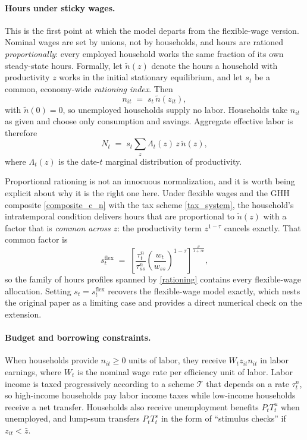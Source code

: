 \paragraph{Hours under sticky wages.} This is the first point at which the
model departs from the flexible-wage version. Nominal wages are set by unions,
not by households, and hours are rationed \emph{proportionally}: every employed
household works the same fraction of its own steady-state hours. Formally, let
$\tilde n(z)$ denote the hours a household with productivity $z$ works in the
initial stationary equilibrium, and let $s_t$ be a common, economy-wide
\emph{rationing index}. Then
\begin{equation}\label{rationing}
  n_{it} \;=\; s_t\,\tilde n(z_{it}),
\end{equation}
with $\tilde n(0)=0$, so unemployed households supply no labor. Households take
$n_{it}$ as given and choose only consumption and savings. Aggregate effective
labor is therefore
\begin{equation}\label{agg_labor_rationed}
  N_t \;=\; s_t \sum_{z} \Lambda_t(z)\, z\, \tilde n(z),
\end{equation}
where $\Lambda_t(z)$ is the date-$t$ marginal distribution of productivity.

Proportional rationing is not an innocuous normalization, and it is worth being
explicit about why it is the right one here. Under flexible wages and the GHH
composite \eqref{composite_c_n} with the tax scheme \eqref{tax_system}, the
household's intratemporal condition delivers hours that are proportional to
$\tilde n(z)$ with a factor that is \emph{common across $z$}: the productivity
term $z^{1-\tau}$ cancels exactly. That common factor is
\begin{equation}\label{s_flex}
  s^{\text{flex}}_t \;=\;
  \left[\frac{\tau_t^n}{\tau^n_{ss}}\left(\frac{w_t}{w_{ss}}\right)^{1-\tau}\right]^{\frac{\nu}{1+\tau\nu}} ,
\end{equation}
so the family of hours profiles spanned by \eqref{rationing} contains every
flexible-wage allocation. Setting $s_t = s^{\text{flex}}_t$ recovers the
flexible-wage model exactly, which nests the original paper as a limiting case
and provides a direct numerical check on the extension.

\paragraph{Budget and borrowing constraints.} When households provide
$n_{it}\geq0$ units of labor, they receive $W_tz_{it}n_{it}$ in labor earnings,
where $W_t$ is the nominal wage rate per efficiency unit of labor. Labor income
is taxed progressively according to a
\textcite{Heathcote-Storesletten-Violante-2017} scheme $\mathcal{T}$ that
depends on a rate $\tau^n_t$, so high-income households pay labor income taxes
while low-income households receive a net transfer. Households also receive
unemployment benefits $P_tT^u_t$ when unemployed, and lump-sum transfers
$P_tT^s_t$ in the form of ``stimulus checks'' if $z_{it}<\bar z$.

